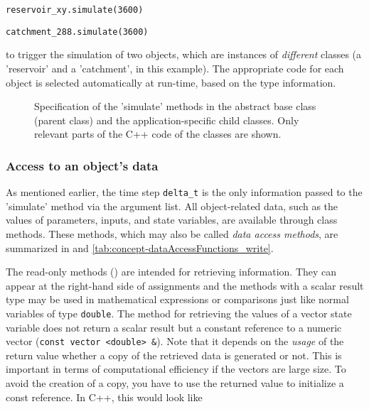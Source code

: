 \medskip
{\small \verb!reservoir_xy.simulate(3600)!}

{\small \verb!catchment_288.simulate(3600)!}
\medskip

to trigger the simulation of two objects, which are instances of \emph{different} classes (a 'reservoir' and a 'catchment', in this example). The appropriate code for each object is selected automatically at run-time, based on the type information.

\begin{figure*}[htb]

  \caption[Specification of the 'simulate' methods in the abstract base class (parent class) and the application-specific child classes.]{Specification of the 'simulate' methods in the abstract base class (parent class) and the application-specific child classes. Only relevant parts of the C++ code of the classes are shown. \label{fig:concept-simulateMethod}}
\end{figure*}

\subsubsection*{Access to an object's data}

As mentioned earlier, the time step \verb!delta_t! is the only information passed to the 'simulate' method via the argument list. All object-related data, such as the values of parameters, inputs, and state variables, are available through class methods. These methods, which may also be called \emph{data access methods}, are summarized in  and \ref{tab:concept-dataAccessFunctions_write}.

The read-only methods () are intended for retrieving information. They can appear at the right-hand side of assignments and the methods with a scalar result type may be used in mathematical expressions or comparisons just like normal variables of type \verb!double!. The method for retrieving the values of a vector state variable does not return a scalar result but a constant reference to a numeric vector (\verb!const vector <double> &!). Note that it depends on the \emph{usage} of the return value whether a copy of the retrieved data is generated or not. This is important in terms of computational efficiency if the vectors are large size. To avoid the creation of a copy, you have to use the returned value to initialize a const reference. In C++, this would look like

